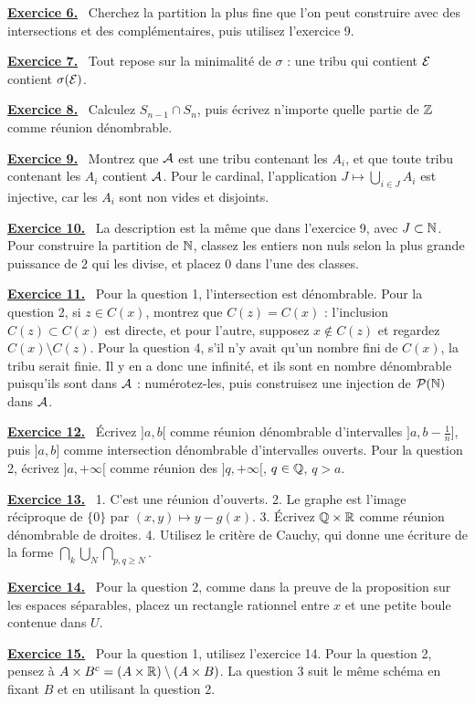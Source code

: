 \documentclass[11pt]{article}
\newcounter{exo}
\newcommand{\indic}[1]{%
  \par\addvspace{0.5em}%
  \hypertarget{ind-#1}{}%
  {\sffamily\bfseries\hyperlink{exo-#1}{Exercice #1.}}\ %
}
\begin{document}
\indic{6} Cherchez la partition la plus fine que l'on peut construire avec des intersections et des complémentaires, puis utilisez l'exercice 9.

\indic{7} Tout repose sur la minimalité de $\sigma$ : une tribu qui contient $\mathcal{E}$ contient $\sigma(\mathcal{E})$.

\indic{8} Calculez $S_{n-1} \cap S_n$, puis écrivez n'importe quelle partie de $\mathbb{Z}$ comme réunion dénombrable.

\indic{9} Montrez que $\mathcal{A}$ est une tribu contenant les $A_i$, et que toute tribu contenant les $A_i$ contient $\mathcal{A}$. Pour le cardinal, l'application $J \mapsto \bigcup_{i\in J} A_i$ est injective, car les $A_i$ sont non vides et disjoints.

\indic{10} La description est la même que dans l'exercice 9, avec $J \subset \mathbb{N}$. Pour construire la partition de $\mathbb{N}$, classez les entiers non nuls selon la plus grande puissance de $2$ qui les divise, et placez $0$ dans l'une des classes.

\indic{11} Pour la question 1, l'intersection est dénombrable. Pour la question 2, si $z \in C(x)$, montrez que $C(z) = C(x)$ : l'inclusion $C(z) \subset C(x)$ est directe, et pour l'autre, supposez $x \notin C(z)$ et regardez $C(x) \setminus C(z)$. Pour la question 4, s'il n'y avait qu'un nombre fini de $C(x)$, la tribu serait finie. Il y en a donc une infinité, et ils sont en nombre dénombrable puisqu'ils sont dans $\mathcal{A}$ : numérotez-les, puis construisez une injection de $\mathcal{P}(\mathbb{N})$ dans $\mathcal{A}$.

\indic{12} Écrivez $]a,b[$ comme réunion dénombrable d'intervalles $]a,b-\frac{1}{n}]$, puis $]a,b]$ comme intersection dénombrable d'intervalles ouverts. Pour la question 2, écrivez $]a,+\infty[$ comme réunion des $]q,+\infty[$, $q\in\mathbb{Q}$, $q>a$.

\indic{13} 1. C'est une réunion d'ouverts. 2. Le graphe est l'image réciproque de $\{0\}$ par $(x,y)\mapsto y-g(x)$. 3. Écrivez $\mathbb{Q} \times \mathbb{R}$ comme réunion dénombrable de droites. 4. Utilisez le critère de Cauchy, qui donne une écriture de la forme $\bigcap_{k}\bigcup_{N}\bigcap_{p,q\geq N}$.

\indic{14} Pour la question 2, comme dans la preuve de la proposition sur les espaces séparables, placez un rectangle rationnel entre $x$ et une petite boule contenue dans $U$.

\indic{15} Pour la question 1, utilisez l'exercice 14. Pour la question 2, pensez à $A \times {B}^{c} = (A \times \mathbb{R}) \setminus (A \times B)$. La question 3 suit le même schéma en fixant $B$ et en utilisant la question 2.
\end{document}
